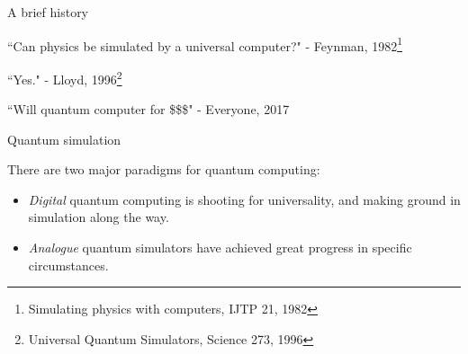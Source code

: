 \documentclass[10pt]{beamer}
\begin{document}




\begin{frame}{A brief history}

``Can physics be simulated by a universal computer?" - Feynman, 1982\footnote{Simulating physics with computers, IJTP 21, 1982}


``Yes." - Lloyd, 1996\footnote{Universal Quantum Simulators, Science 273, 1996}


``Will quantum computer for \$\$\$" - Everyone, 2017

\end{frame}

\begin{frame}{Quantum simulation}

There are two major paradigms for quantum computing:

\begin{itemize}
    \item \emph{Digital} quantum computing is shooting for universality, and making ground in simulation along the way.
    \item \emph{Analogue} quantum simulators have achieved great progress in specific circumstances.
\end{itemize}


\end{frame}
\end{document}
